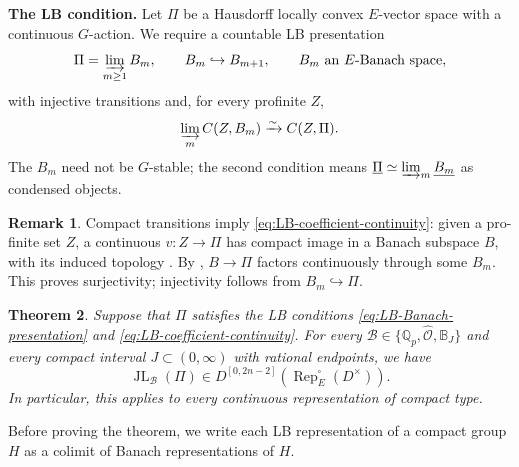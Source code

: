 \documentclass[11pt]{article}
\newtheorem{theorem}{Theorem}[section]
\theoremstyle{definition}
\newtheorem{remark}[theorem]{Remark}
\newcommand{\Qp}{\mathbb Q_p}
\newcommand{\JL}{\operatorname{JL}}
\newcommand{\Rep}{\operatorname{Rep}}
\begin{document}
\noindent\textbf{The LB condition.}
Let \(\Pi\) be a Hausdorff locally convex \(E\)-vector space with a
continuous \(G\)-action.  We require a countable LB presentation
\begin{equation}\label{eq:LB-Banach-presentation}
 \Pi=\varinjlim_{m\geq1} B_m,\qquad
 B_m\hookrightarrow B_{m+1},
 \qquad B_m\text{ an }E\text{-Banach space},
\end{equation}
with injective transitions and, for every profinite \(Z\),
\begin{equation}\label{eq:LB-coefficient-continuity}
 \varinjlim_m C(Z,B_m)\xrightarrow{\sim}C(Z,\Pi).
\end{equation}
The \(B_m\) need not be \(G\)-stable; the second condition means
\(\underline\Pi\simeq\varinjlim_m\underline{B_m}\) as condensed objects.

\begin{remark}
Compact transitions imply \eqref{eq:LB-coefficient-continuity}: given a pro-finite set $Z$,
a continuous \(v:Z\to\Pi\) has compact image in a Banach
subspace \(B\), with its induced topology
\cite[Proposition~1.1.11]{EmertonAnalytic}.  By
\cite[Propositions~1.1.2(ii) and~1.1.10]{EmertonAnalytic},
\(B\to\Pi\) factors continuously through some \(B_m\).
This proves surjectivity; injectivity follows from
\(B_m\hookrightarrow\Pi\).
\end{remark}

\begin{theorem}%
\label{thm:LB-amplitude}
\label{cor:structural-LB-amplitude}
\label{cor:period-LB-amplitude}
Suppose that \(\Pi\) satisfies the LB conditions
\eqref{eq:LB-Banach-presentation} and \eqref{eq:LB-coefficient-continuity}.
For every \(\mathscr B\in\{\Qp,\widehat{\mathscr O},\mathbb B_J\}\)
and every compact interval \(J\subset(0,\infty)\) with rational endpoints, we have
\begin{equation*}
 \JL_{\mathscr B}(\Pi)
 \in D^{[0,2n-2]}(\Rep_E^\square(D^\times)).
\end{equation*}
In particular, this applies to every continuous representation of compact type.
\end{theorem}

Before proving the theorem, we write each LB representation of a compact group $H$
as a colimit of Banach representations of $H$.
\end{document}
